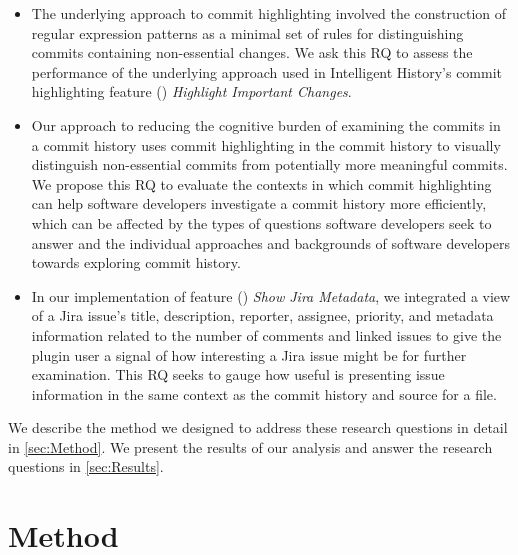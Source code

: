 \begin{itemize}[leftmargin=*]
    \item[]  
    The underlying approach to commit highlighting involved the construction of regular expression patterns 
    as a minimal set of rules for distinguishing commits containing non-essential changes.
    We ask this RQ to assess the performance of the underlying approach 
    used in Intelligent History's commit highlighting feature () \textit{Highlight Important Changes}.

    \item[] 
    Our approach to reducing the cognitive burden of examining the commits in a commit history uses commit highlighting in
    the commit history to visually distinguish non-essential commits from potentially more meaningful commits. 
    We propose this RQ to evaluate the contexts in which commit highlighting can help software developers
    investigate a commit history more efficiently, which can be affected by the types of 
    questions software developers seek to answer and the individual approaches and backgrounds of software developers towards
    exploring commit history.

    \item[] 
    In our implementation of feature () \textit{Show Jira Metadata}, we integrated a view of a Jira issue's title, description, reporter, assignee, priority,
    and metadata information related to the number of comments and linked issues to give the plugin user a signal 
    of how interesting a Jira issue might be for further examination.
    This RQ seeks to gauge how useful is presenting issue information in the same context as the commit history and source for a file.
\end{itemize}

We describe the method we designed to address these research questions in detail in \autoref{sec:Method}.
We present the results of our analysis and answer the research questions in \autoref{sec:Results}.

\section{Method}
\label{sec:Method}


